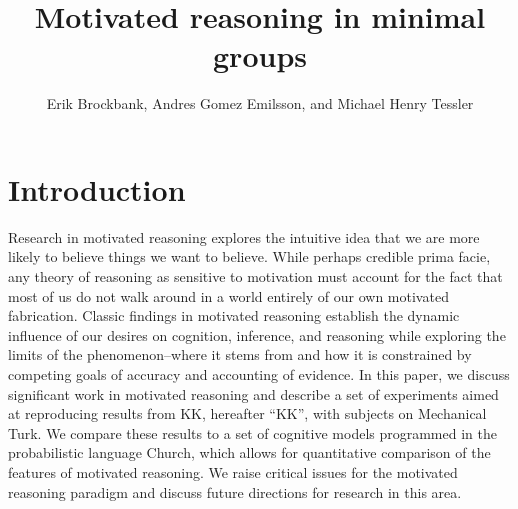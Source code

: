 \documentclass{article}
\begin{document}
 \title{Motivated reasoning in minimal groups}
\author{Erik Brockbank, Andres Gomez Emilsson, and Michael Henry Tessler} \renewcommand{\today}{Psych 241\\June 8,
2014} \maketitle

\section{Introduction}

Research in motivated reasoning explores the intuitive idea that we are more likely to believe things we want to believe. While perhaps credible prima facie, any theory of reasoning as sensitive to motivation must account for the fact that most of us do not walk around in a world entirely of our own motivated fabrication. Classic findings in motivated reasoning establish the dynamic influence of our desires on cognition, inference, and reasoning while exploring the limits of the phenomenon--where it stems from and how it is constrained by competing goals of accuracy and accounting of evidence. In this paper, we discuss significant work in motivated reasoning and describe a set of experiments aimed at reproducing results from KK, hereafter ``KK'', with subjects on Mechanical Turk. We compare these results to a set of cognitive models programmed in the probabilistic language Church, which allows for quantitative comparison of the features of motivated reasoning. We raise critical issues for the motivated reasoning paradigm and discuss future directions for research in this area. 
\end{document}
